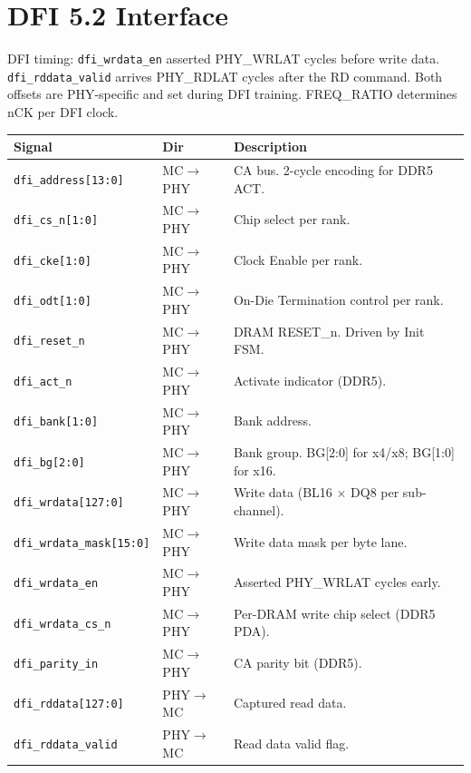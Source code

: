 \documentclass[10pt,a4paper]{article}
\newcommand{\Th}[1]{\cellcolor{cellbg}\textbf{\small #1}}
\newcommand{\RA}{\rowcolor{white}}
\newcommand{\RB}{\rowcolor{altbg}}
\begin{document}
\section{DFI 5.2 Interface}

DFI timing: \texttt{dfi\_wrdata\_en} asserted PHY\_WRLAT cycles before write data.
\texttt{dfi\_rddata\_valid} arrives PHY\_RDLAT cycles after the RD command.
Both offsets are PHY-specific and set during DFI training. FREQ\_RATIO determines
nCK per DFI clock.

\begin{center}
\begin{tabularx}{\linewidth}{@{} l l X @{}}
\toprule
\Th{Signal} & \Th{Dir} & \Th{Description} \\
\midrule
\RA \texttt{dfi\_address[13:0]} & MC$\to$PHY & CA bus. 2-cycle encoding for DDR5 ACT. \\
\RB \texttt{dfi\_cs\_n[1:0]} & MC$\to$PHY & Chip select per rank. \\
\RA \texttt{dfi\_cke[1:0]} & MC$\to$PHY & Clock Enable per rank. \\
\RB \texttt{dfi\_odt[1:0]} & MC$\to$PHY & On-Die Termination control per rank. \\
\RA \texttt{dfi\_reset\_n} & MC$\to$PHY & DRAM RESET\_n. Driven by Init FSM. \\
\RB \texttt{dfi\_act\_n} & MC$\to$PHY & Activate indicator (DDR5). \\
\RA \texttt{dfi\_bank[1:0]} & MC$\to$PHY & Bank address. \\
\RB \texttt{dfi\_bg[2:0]} & MC$\to$PHY & Bank group. BG[2:0] for x4/x8; BG[1:0] for x16. \\
\RA \texttt{dfi\_wrdata[127:0]} & MC$\to$PHY & Write data (BL16 $\times$ DQ8 per sub-channel). \\
\RB \texttt{dfi\_wrdata\_mask[15:0]} & MC$\to$PHY & Write data mask per byte lane. \\
\RA \texttt{dfi\_wrdata\_en} & MC$\to$PHY & Asserted PHY\_WRLAT cycles early. \\
\RB \texttt{dfi\_wrdata\_cs\_n} & MC$\to$PHY & Per-DRAM write chip select (DDR5 PDA). \\
\RA \texttt{dfi\_parity\_in} & MC$\to$PHY & CA parity bit (DDR5). \\
\RB \texttt{dfi\_rddata[127:0]} & PHY$\to$MC & Captured read data. \\
\RA \texttt{dfi\_rddata\_valid} & PHY$\to$MC & Read data valid flag. \\

\end{tabularx}
\end{center}
\end{document}
